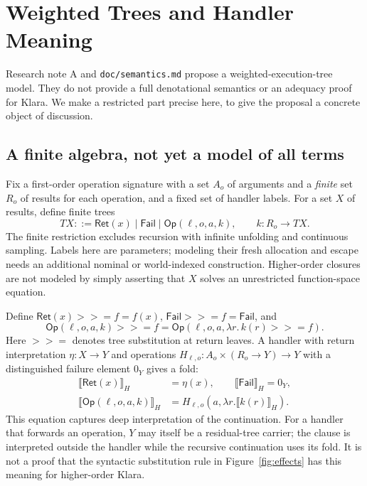 \documentclass[acmsmall,screen,review,nonacm]{acmart}
\newcommand{\kw}[1]{\mathsf{#1}}
\newcommand{\bind}{\mathbin{>\!\!>\!=}}
\newcommand{\den}[1]{\llbracket #1\rrbracket}
\newcommand{\src}[1]{{\normalfont\nolinkurl{#1}}}
\begin{document}
\section{Weighted Trees and Handler Meaning}\label{sec:den}
Research note A and \src{doc/semantics.md} propose a weighted-execution-tree
model. They do not provide a full denotational semantics or an adequacy proof
for Klara. We make a restricted part precise here, to give the proposal a
concrete object of discussion.

\subsection{A finite algebra, not yet a model of all terms}
Fix a first-order operation signature with a set $A_o$ of arguments and a
\emph{finite} set $R_o$ of results for each operation, and a fixed set of
handler labels. For a set $X$ of results, define finite trees
\[
 T X ::= \kw{Ret}(x)\mid\kw{Fail}
       \mid\kw{Op}(\ell,o,a,k),\qquad k:R_o\to T X.
\]
The finite restriction excludes recursion with infinite unfolding and
continuous sampling. Labels here are parameters; modeling their fresh
allocation and escape needs an additional nominal or world-indexed
construction. Higher-order closures are not modeled by simply asserting that
$X$ solves an unrestricted function-space equation.

Define $\kw{Ret}(x)\bind f=f(x)$, $\kw{Fail}\bind f=\kw{Fail}$, and
\[
 \kw{Op}(\ell,o,a,k)\bind f
 =\kw{Op}(\ell,o,a,\lambda r.\,k(r)\bind f).
\]
Here $\bind$ denotes tree substitution at return leaves. A handler with return
interpretation $\eta:X\to Y$ and operations
$H_{\ell,o}:A_o\times(R_o\to Y)\to Y$ with a distinguished failure element $0_Y$ gives a fold:
\[
\begin{split}
\den{\kw{Ret}(x)}_H&=\eta(x),\qquad
\den{\kw{Fail}}_H=0_Y,\\
\den{\kw{Op}(\ell,o,a,k)}_H&=
 H_{\ell,o}(a,\lambda r.\den{k(r)}_H).
\end{split}
\]
This equation captures deep interpretation of the continuation. For a handler
that forwards an operation, $Y$ may itself be a residual-tree carrier; the
clause is interpreted outside the handler while the recursive continuation
uses its fold. It is not a proof that the syntactic substitution rule in
Figure~\ref{fig:effects} has this meaning for higher-order Klara.
\end{document}
